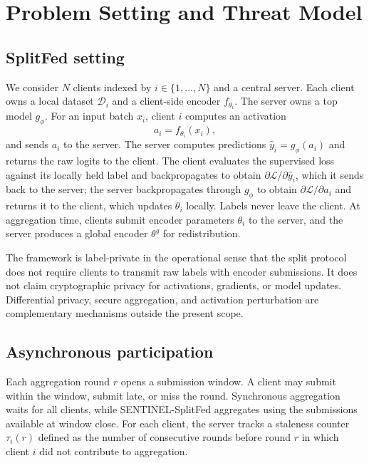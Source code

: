 \documentclass[pdflatex,sn-mathphys-num]{sn-jnl}
\begin{document}
\section{Problem Setting and Threat Model}\label{sec:problem}

\subsection{SplitFed setting}

We consider $N$ clients indexed by $i\in\{1,\ldots,N\}$ and a central server. Each client owns a local dataset $\mathcal{D}_i$ and a client-side encoder $f_{\theta_i}$. The server owns a top model $g_\phi$. For an input batch $x_i$, client $i$ computes an activation
\begin{equation}
    a_i = f_{\theta_i}(x_i),
\end{equation}
and sends $a_i$ to the server. The server computes predictions $\hat{y}_i = g_\phi(a_i)$ and returns the raw logits to the client. The client evaluates the supervised loss against its locally held label and backpropagates to obtain $\partial \mathcal{L}/\partial \hat{y}_i$, which it sends back to the server; the server backpropagates through $g_\phi$ to obtain $\partial \mathcal{L}/\partial a_i$ and returns it to the client, which updates $\theta_i$ locally. Labels never leave the client. At aggregation time, clients submit encoder parameters $\theta_i$ to the server, and the server produces a global encoder $\theta^g$ for redistribution.

The framework is label-private in the operational sense that the split protocol does not require clients to transmit raw labels with encoder submissions. It does not claim cryptographic privacy for activations, gradients, or model updates. Differential privacy, secure aggregation, and activation perturbation are complementary mechanisms outside the present scope.

\subsection{Asynchronous participation}

Each aggregation round $r$ opens a submission window. A client may submit within the window, submit late, or miss the round. Synchronous aggregation waits for all clients, while SENTINEL-SplitFed aggregates using the submissions available at window close. For each client, the server tracks a staleness counter $\tau_i(r)$ defined as the number of consecutive rounds before round $r$ in which client $i$ did not contribute to aggregation.
\end{document}
